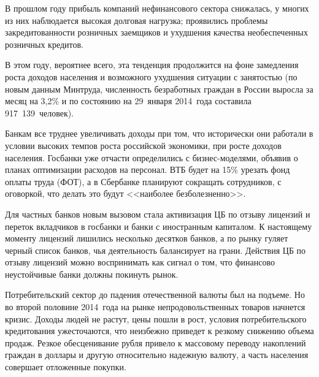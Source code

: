   В прошлом году прибыль компаний нефинансового сектора снижалась, у многих из
  них наблюдается высокая долговая нагрузка; проявились проблемы
  закредитованности розничных заемщиков и ухудшения качества необеспеченных
  розничных кредитов.

  В этом году, вероятнее всего, эта тенденция продолжится на фоне замедления
  роста доходов населения и возможного ухудшения ситуации с занятостью (по
  новым данным Минтруда, численность безработных граждан в России выросла за
  месяц на 3,2\% и по состоянию на 29~января 2014~года составила
  917~139~человек).

  Банкам все труднее увеличивать доходы при том, что исторически они работали в
  условии высоких темпов роста российской экономики, при росте доходов
  населения. Госбанки уже отчасти определились с бизнес-моделями, объявив о
  планах оптимизации расходов на персонал. ВТБ будет на 15\% урезать фонд
  оплаты труда (ФОТ), а в Сбербанке планируют сокращать сотрудников, с
  оговоркой, что делать это будут <<наиболее безболезненно>>.

  Для частных банков новым вызовом стала активизация ЦБ по отзыву лицензий и
  переток вкладчиков в госбанки и банки с иностранным капиталом. К настоящему
  моменту лицензий лишились несколько десятков банков, а по рынку гуляет черный
  список банков, чья деятельность балансирует на грани. Действия ЦБ по отзыву
  лицензий можно воспринимать как сигнал о том, что финансово неустойчивые
  банки должны покинуть рынок.

  Потребительский сектор до падения отечественной валюты был на подъеме. Но во
  второй половине 2014~года на рынке непродовольственных товаров начнется
  кризис. Доходы людей не растут, цены пошли в рост, условия потребительского
  кредитования ужесточаются, что неизбежно приведет к резкому снижению объема
  продаж. Резкое обесценивание рубля привело к массовому переводу накоплений
  граждан в доллары и другую относительно надежную валюту, а часть населения
  совершает отложенные покупки.

